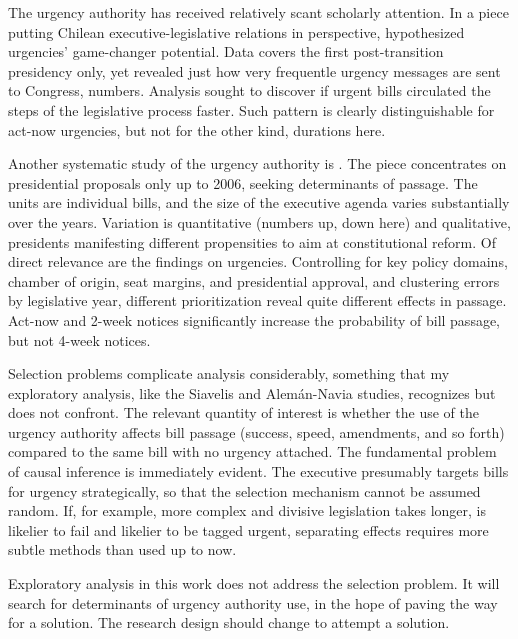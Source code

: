 \documentclass[letter,12pt]{article}
\begin{document}

The urgency authority has received relatively scant scholarly attention. In a piece putting Chilean executive-legislative relations in perspective, \citet{siavelis.2002} hypothesized urgencies' game-changer potential. Data covers the first post-transition presidency only, yet revealed just how very frequentle urgency messages are sent to Congress, numbers. Analysis sought to discover if urgent bills circulated the steps of the legislative process faster. Such pattern is clearly distinguishable for act-now urgencies, but not for the other kind, durations here. 

Another systematic study of the urgency authority is \citet{aleman.navia.UrgChi.2009}. The piece concentrates on presidential proposals only up to 2006, seeking determinants of passage. The units are individual bills, and the size of the executive agenda varies substantially over the years. Variation is quantitative (numbers up, down here) and qualitative, presidents manifesting different propensities to aim at constitutional reform. Of direct relevance are the findings on urgencies. Controlling for key policy domains, chamber of origin, seat margins, and presidential approval, and clustering errors by legislative year, different prioritization reveal quite different effects in passage. Act-now and 2-week notices significantly increase the probability of bill passage, but not 4-week notices. 

Selection problems complicate analysis considerably, something that my exploratory analysis, like the Siavelis and Alemán-Navia studies, recognizes but does not confront. The relevant quantity of interest is whether the use of the urgency authority affects bill passage (success, speed, amendments, and so forth) compared to the same bill with no urgency attached. The fundamental problem of causal inference is immediately evident. The executive presumably targets bills for urgency strategically, so that the selection mechanism cannot be assumed random. If, for example, more complex and divisive legislation takes longer, is likelier to fail and likelier to be tagged urgent, separating effects requires more subtle methods than used up to now.

Exploratory analysis in this work does not address the selection problem. It will search for determinants of urgency authority use, in the hope of paving the way for a solution. The research design should change to attempt a solution. 
\end{document}
